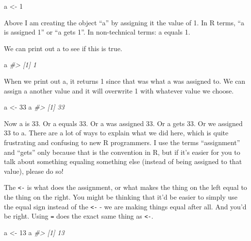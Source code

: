 \documentclass[
]{krantz}
\makeatletter
\newenvironment{Shaded}{\begin{snugshade}}{\end{snugshade}}
\newcommand{\CommentTok}[1]{\textcolor[rgb]{0.37,0.37,0.37}{\textit{#1}}}
\newcommand{\DecValTok}[1]{\textcolor[rgb]{0.06,0.06,0.06}{#1}}
\newcommand{\NormalTok}[1]{#1}
\newcommand{\OtherTok}[1]{\textcolor[rgb]{0.37,0.37,0.37}{#1}}
\newenvironment{kframe}{%
\medskip{}
\setlength{\fboxsep}{.8em}
 \def\at@end@of@kframe{}%
 \ifinner\ifhmode%
  \def\at@end@of@kframe{\end{minipage}}%
  \begin{minipage}{\columnwidth}%
 \fi\fi%
 \def\FrameCommand##1{\hskip\@totalleftmargin \hskip-\fboxsep
 \colorbox{shadecolor}{##1}\hskip-\fboxsep
     \hskip-\linewidth \hskip-\@totalleftmargin \hskip\columnwidth}%
 \MakeFramed {\advance\hsize-\width
   \@totalleftmargin\z@ \linewidth\hsize
   \@setminipage}}%
 {\par\unskip\endMakeFramed%
 \at@end@of@kframe}
\renewenvironment{Shaded}{\begin{kframe}}{\end{kframe}}
\makeatother
\begin{document}
\begin{Shaded}
\begin{Highlighting}[]
\NormalTok{a }\OtherTok{\textless{}{-}} \DecValTok{1}
\end{Highlighting}
\end{Shaded}

Above I am creating the object ``a'' by assigning it the
value of 1. In R terms, ``a is assigned 1'' or ``a gets 1''.
In non-technical terms: a equals 1.

We can print out a to see if this is true.

\begin{Shaded}
\begin{Highlighting}[]
\NormalTok{a}
\CommentTok{\#\textgreater{} [1] 1}
\end{Highlighting}
\end{Shaded}

When we print out a, it returns 1 since that was what a was
assigned to. We can assign a another value and it will
overwrite 1 with whatever value we choose.

\begin{Shaded}
\begin{Highlighting}[]
\NormalTok{a }\OtherTok{\textless{}{-}} \DecValTok{33}
\NormalTok{a}
\CommentTok{\#\textgreater{} [1] 33}
\end{Highlighting}
\end{Shaded}

Now a is 33. Or a equals 33. Or a was assigned 33. Or a gets
33. Or we assigned 33 to a. There are a lot of ways to
explain what we did here, which is quite frustrating and
confusing to new R programmers. I use the terms
``assignment'' and ``gets'' only because that is the
convention in R, but if it's easier for you to talk about
something equaling something else (instead of being assigned
to that value), please do so!

The \texttt{\textless{}-} is what does the assignment, or
what makes the thing on the left equal to the thing on the
right. You might be thinking that it'd be easier to simply
use the equal sign instead of the \texttt{\textless{}-} - we
are making things equal after all. And you'd be right. Using
\texttt{=} does the exact same thing as
\texttt{\textless{}-}.

\begin{Shaded}
\begin{Highlighting}[]
\NormalTok{a }\OtherTok{\textless{}{-}} \DecValTok{13}
\NormalTok{a}
\CommentTok{\#\textgreater{} [1] 13}
\end{Highlighting}
\end{Shaded}
\end{document}
